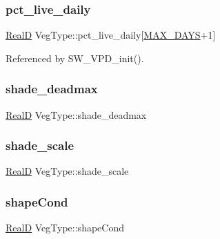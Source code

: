 \subsubsection{\texorpdfstring{pct\+\_\+live\+\_\+daily}{pct\_live\_daily}}
{\footnotesize\ttfamily \hyperlink{generic_8h_af1c105fd5732f70b91ddaeda0cc340e3}{RealD} Veg\+Type\+::pct\+\_\+live\+\_\+daily\mbox{[}\hyperlink{_times_8h_a01f08d46080872b9f4284873b7f9dee4}{M\+A\+X\+\_\+\+D\+A\+YS}+1\mbox{]}}



Referenced by S\+W\+\_\+\+V\+P\+D\+\_\+init().

\mbox{\label{struct_veg_type_aff715aa3ea34e7408699818553e6cc75}} 
\subsubsection{\texorpdfstring{shade\+\_\+deadmax}{shade\_deadmax}}
{\footnotesize\ttfamily \hyperlink{generic_8h_af1c105fd5732f70b91ddaeda0cc340e3}{RealD} Veg\+Type\+::shade\+\_\+deadmax}

\mbox{\label{struct_veg_type_a81084955a7bb26a6856a846e53c1f9f0}} 
\subsubsection{\texorpdfstring{shade\+\_\+scale}{shade\_scale}}
{\footnotesize\ttfamily \hyperlink{generic_8h_af1c105fd5732f70b91ddaeda0cc340e3}{RealD} Veg\+Type\+::shade\+\_\+scale}

\mbox{\label{struct_veg_type_aea3b830249ff5131c0fbed64fc1f4c05}} 
\subsubsection{\texorpdfstring{shape\+Cond}{shapeCond}}
{\footnotesize\ttfamily \hyperlink{generic_8h_af1c105fd5732f70b91ddaeda0cc340e3}{RealD} Veg\+Type\+::shape\+Cond}

\mbox{\label{struct_veg_type_a5eb5135d8e977bc384af507469e1f713}} 
